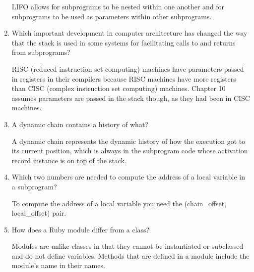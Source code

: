 \begin{enumerate}
\begin{answer}
    LIFO allows for subprograms to be nested within one another and
    for subprograms to be used as parameters within other subprograms.
    
\end{answer}

  \item Which important development in computer architecture
    has changed the way that the stack is used in some
    systems for facilitating calls to and returns from
    subprograms?

\begin{answer}

    RISC (reduced instruction set computing) machines have parameters
    passed in registers in their compilers because RISC machines have
    more registers than CISC (complex instruction set computing)
    machines. Chapter 10 assumes parameters are passed in the stack
    though, as they had been in CISC machines.
    
\end{answer}

  \item A dynamic chain contains a history of what?

\begin{answer}

  A dynamic chain represents the dynamic history of how the execution
  got to its current position, which is always in the subprogram code
  whose activation record instance is on top of the stack.
  
\end{answer}

  \item Which two numbers are needed to compute
    the address of a local variable in a subprogram?

\begin{answer}

To compute the address of a local variable you need the (chain\_offset,
local\_offset) pair.

\end{answer}

  \item How does a Ruby module differ from a class?
  
  \begin{answer}
  
  Modules are unlike classes in that they cannot be instantiated or
  subclassed and do not define variables. Methods that are defined in
  a module include the module’s name in their names.
  

\end{answer}
\end{enumerate}
